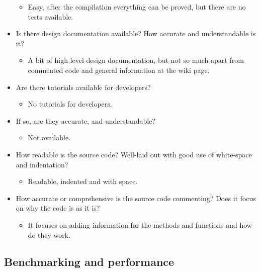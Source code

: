\begin{itemize}
  \begin{itemize}
  \itemsep1pt\parskip0pt
  \item
    Easy, after the compilation everything can be proved, but there are
    no tests available.
  \end{itemize}
\item
  Is there design documentation available? How accurate and
  understandable is it?

  \begin{itemize}
  \itemsep1pt\parskip0pt
  \item
    A bit of high level design documentation, but not so much apart from
    commented code and general information at the wiki page.
  \end{itemize}
\item
  Are there tutorials available for developers?

  \begin{itemize}
  \itemsep1pt\parskip0pt
  \item
    No tutorials for developers.
  \end{itemize}
\item
  If so, are they accurate, and understandable?

  \begin{itemize}
  \itemsep1pt\parskip0pt
  \item
    Not available.
  \end{itemize}
\item
  How readable is the source code? Well-laid out with good use of
  white-space and indentation?

  \begin{itemize}
  \itemsep1pt\parskip0pt
  \item
    Readable, indented and with space.
  \end{itemize}
\item
  How accurate or comprehensive is the source code commenting? Does it
  focus on why the code is as it is?

  \begin{itemize}
  \itemsep1pt\parskip0pt
  \item
    It focuses on adding information for the methods and functions and
    how do they work.
  \end{itemize}
\end{itemize}

\subsection{Benchmarking and performance}

